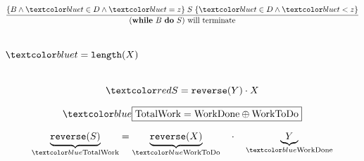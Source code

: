 \begin{frame}
  \[
    \dfrac{\{B \land \blue{t \in D} \land \blue{t = z}\}\; S\; \{\blue{t \in D} \land \blue{t < z} \}}
    {(\textbf{while}\ B\ \textbf{do}\ S) \text{ will terminate}}
  \]
  
  \begin{columns}
      
      \pause
      \[
        \blue{t = \texttt{length}(X)}
      \]
  \end{columns}
\end{frame}

\begin{frame}
  \[
    \red{S = \texttt{reverse}(Y) \cdot X}
  \]
  
  \pause
  \[
    \blue{\boxed{\text{TotalWork} = \text{WorkDone} \oplus \text{WorkToDo}}}
  \]
  
  \pause
  \[
    \underbrace{\texttt{reverse}(S)}_{\blue{\text{TotalWork}}} = \underbrace{\texttt{reverse}(X)}_{\blue{\text{WorkToDo}}} \quad \cdot \quad
    \underbrace{Y}_{\blue{\text{WorkDone}}}
  \]
\end{frame}
